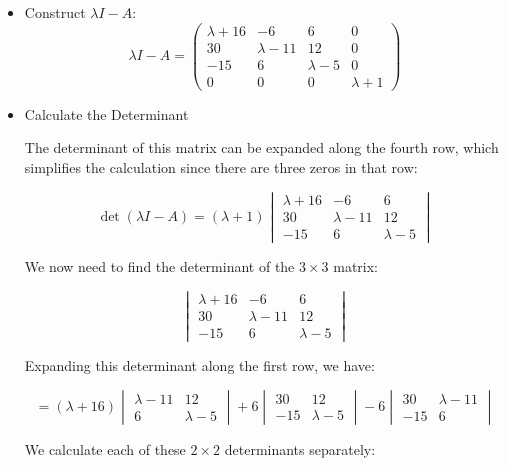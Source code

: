 \documentclass{article}
\begin{document}
\begin{itemize}
    \item Construct \( \lambda I - A \):
          \[
              \lambda I - A = \begin{pmatrix} \lambda + 16 & -6 & 6 & 0 \\ 30 & \lambda - 11 & 12 & 0 \\ -15 & 6 & \lambda - 5 & 0 \\ 0 & 0 & 0 & \lambda + 1 \end{pmatrix}
          \]

    \item Calculate the Determinant

          The determinant of this matrix can be expanded along the fourth row, which simplifies the calculation since there are three zeros in that row:

          \[
              \det(\lambda I - A) = (\lambda + 1) \begin{vmatrix} \lambda + 16 & -6 & 6 \\ 30 & \lambda - 11 & 12 \\ -15 & 6 & \lambda - 5 \end{vmatrix}
          \]

          We now need to find the determinant of the \( 3 \times 3 \) matrix:

          \[
              \begin{vmatrix} \lambda + 16 & -6 & 6 \\ 30 & \lambda - 11 & 12 \\ -15 & 6 & \lambda - 5 \end{vmatrix}
          \]

          Expanding this determinant along the first row, we have:

          \[
              = (\lambda + 16) \begin{vmatrix} \lambda - 11 & 12 \\ 6 & \lambda - 5 \end{vmatrix} + 6 \begin{vmatrix} 30 & 12 \\ -15 & \lambda - 5 \end{vmatrix} - 6 \begin{vmatrix} 30 & \lambda - 11 \\ -15 & 6 \end{vmatrix}
          \]

          We calculate each of these \( 2 \times 2 \) determinants separately:


\end{itemize}
\end{document}
